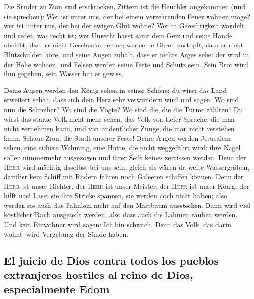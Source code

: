  Die Sünder zu Zion sind erschrocken, Zittern ist die
Heuchler angekommen (und sie sprechen): Wer ist unter uns, der bei einem
verzehrenden Feuer wohnen möge? wer ist unter uns, der bei der ewigen
Glut wohne?  Wer in Gerechtigkeit wandelt und redet, was
recht ist; wer Unrecht hasst samt dem Geiz und seine Hände abzieht, dass
er nicht Geschenke nehme; wer seine Ohren zustopft, dass er nicht
Blutschulden höre, und seine Augen zuhält, dass er nichts Arges sehe:
 der wird in der Höhe wohnen, und Felsen werden seine
Feste und Schutz sein. Sein Brot wird ihm gegeben, sein Wasser hat er
gewiss.

 Deine Augen werden den König sehen in seiner Schöne; du
wirst das Land erweitert sehen,  dass sich dein Herz sehr
verwundern wird und sagen: Wo sind nun die Schreiber? Wo sind die Vögte?
Wo sind die, die die Türme zählten?  Du wirst das starke
Volk nicht mehr sehen, das Volk von tiefer Sprache, die man nicht
vernehmen kann, und von undeutlicher Zunge, die man nicht verstehen
kann.  Schaue Zion, die Stadt unserer Feste! Deine Augen
werden Jerusalem sehen, eine sichere Wohnung, eine Hütte, die nicht
weggeführt wird; ihre Nägel sollen nimmermehr ausgezogen und ihrer Seile
keines zerrissen werden.  Denn der \textsc{Herr} wird
mächtig daselbst bei uns sein, gleich als wären da weite Wassergräben,
darüber kein Schiff mit Rudern fahren noch Galeeren schiffen können.
 Denn der \textsc{Herr} ist unser Richter, der
\textsc{Herr} ist unser Meister, der \textsc{Herr} ist unser König; der
hilft uns!  Lasst sie ihre Stricke spannen, sie werden
doch nicht halten; also werden sie auch das Fähnlein nicht auf den
Mastbaum ausstecken. Dann wird viel köstlicher Raub ausgeteilt werden,
also dass auch die Lahmen rauben werden.  Und kein
Einwohner wird sagen: Ich bin schwach. Denn das Volk, das darin wohnt,
wird Vergebung der Sünde haben.

\hypertarget{el-juicio-de-dios-contra-todos-los-pueblos-extranjeros-hostiles-al-reino-de-dios-especialmente-edom}{%
\subsection{El juicio de Dios contra todos los pueblos extranjeros
hostiles al reino de Dios, especialmente
Edom}\label{el-juicio-de-dios-contra-todos-los-pueblos-extranjeros-hostiles-al-reino-de-dios-especialmente-edom}}

